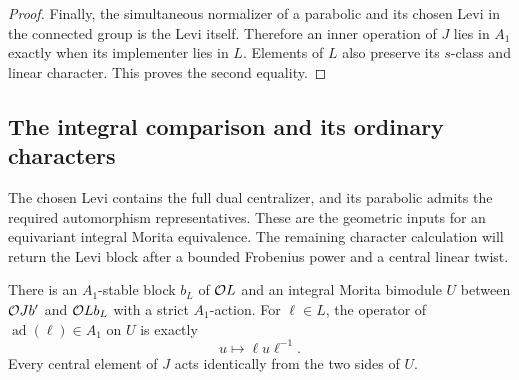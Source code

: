 \begin{proof}
Finally, the simultaneous normalizer of a parabolic and its chosen
Levi in the connected group is the Levi itself.  Therefore an
inner operation of $J$ lies in $A_1$ exactly when its implementer
lies in $L$.  Elements of $L$ also preserve its $s$-class and linear
character.  This proves the second equality.
\end{proof}

\subsection{The integral comparison and its ordinary characters}

The chosen Levi contains the full dual centralizer, and its
parabolic admits the required automorphism representatives.
These are the geometric inputs for an equivariant integral
Morita equivalence.  The remaining character calculation will
return the Levi block after a bounded Frobenius power and a
central linear twist.

\begin{lemma}\label{per:br}
There is an $A_1$-stable block $b_L$ of $\mathcal O L$ and an integral Morita
bimodule $U$ between $\mathcal O Jb'$ and $\mathcal O Lb_L$ with a strict
$A_1$-action.  For $\ell\in L$, the operator of
$\operatorname{ad}(\ell)\in A_1$ on $U$ is exactly
\begin{equation}\label{per:br-inner}
 u\longmapsto\ell u\ell^{-1}.
\end{equation}
Every central element of $J$ acts identically from the two sides of
$U$.
\end{lemma}

